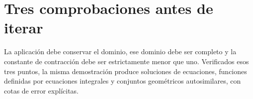 \section{Tres comprobaciones antes de iterar}
La aplicación debe conservar el dominio, ese dominio debe ser completo y la constante de contracción debe ser estrictamente menor que uno. Verificados esos tres puntos, la misma demostración produce soluciones de ecuaciones, funciones definidas por ecuaciones integrales y conjuntos geométricos autosimilares, con cotas de error explícitas.

